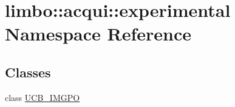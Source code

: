 \hypertarget{namespacelimbo_1_1acqui_1_1experimental}{}\section{limbo\+:\+:acqui\+:\+:experimental Namespace Reference}
\label{namespacelimbo_1_1acqui_1_1experimental}
\subsection*{Classes}
\begin{DoxyCompactItemize}
\item 
class \hyperlink{classlimbo_1_1acqui_1_1experimental_1_1_u_c_b___i_m_g_p_o}{U\+C\+B\+\_\+\+I\+M\+G\+P\+O}
\end{DoxyCompactItemize}
